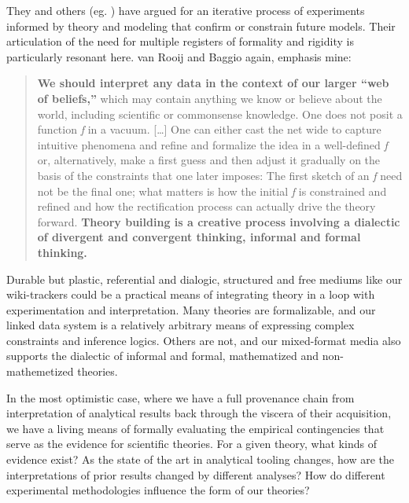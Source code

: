 They and others (eg. \citep{guestHowComputationalModeling2021} )
have argued for an iterative process of experiments informed by theory
and modeling that confirm or constrain future models. Their articulation
of the need for multiple registers of formality and rigidity is
particularly resonant here. van Rooij and Baggio again, emphasis mine:

\begin{quote}
\textbf{We should interpret any data in the context of our larger ``web
of beliefs,''} which may contain anything we know or believe about the
world, including scientific or commonsense knowledge. One does not posit
a function \emph{f} in a vacuum. {[}\ldots{]} One can either cast the
net wide to capture intuitive phenomena and refine and formalize the
idea in a well-defined \emph{f} or, alternatively, make a first guess
and then adjust it gradually on the basis of the constraints that one
later imposes: The first sketch of an \emph{f} need not be the final
one; what matters is how the initial \emph{f} is constrained and refined
and how the rectification process can actually drive the theory forward.
\textbf{Theory building is a creative process involving a dialectic of
divergent and convergent thinking, informal and formal thinking.} \citep{vanrooijTheoryTestHow2021} 
\end{quote}

Durable but plastic, referential and dialogic, structured and free
mediums like our wiki-trackers could be a practical means of integrating
theory in a loop with experimentation and interpretation. Many theories
are formalizable, and our linked data system is a relatively arbitrary
means of expressing complex constraints and inference logics. Others are
not, and our mixed-format media also supports the dialectic of informal
and formal, mathematized and non-mathemetized theories.

In the most optimistic case, where we have a full provenance chain from
interpretation of analytical results back through the viscera of their
acquisition, we have a living means of formally evaluating the empirical
contingencies that serve as the evidence for scientific theories. For a
given theory, what kinds of evidence exist? As the state of the art in
analytical tooling changes, how are the interpretations of prior results
changed by different analyses? How do different experimental
methodologies influence the form of our theories?


